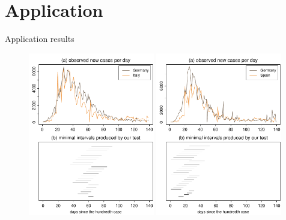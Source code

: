 \documentclass[10pt, handout]{beamer}
\begin{document}
\section{Application}
\begin{frame}{Application results}
	\begin{figure}
		\includegraphics[width=0.49\textwidth]{plots/DEU_vs_ITA_presentation}
		\hfill
		\includegraphics[width=0.49\textwidth]{plots/DEU_vs_ESP_presentation}
	\end{figure}
\end{frame}
\end{document}

